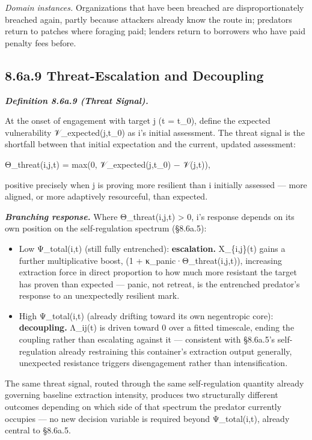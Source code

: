 \documentclass[
]{article}
\begin{document}
\emph{Domain instances.} Organizations that have been breached are
disproportionately breached again, partly because attackers already know
the route in; predators return to patches where foraging paid; lenders
return to borrowers who have paid penalty fees before.

\hypertarget{a.9-threat-escalation-and-decoupling}{%
\subsection{8.6a.9 Threat-Escalation and
Decoupling}\label{a.9-threat-escalation-and-decoupling}}

\emph{\textbf{Definition 8.6a.9 (Threat Signal).}}

At the onset of engagement with target j (t = t\_0), define the expected
vulnerability 𝒱\_expected(j,t\_0) as i's initial assessment. The threat
signal is the shortfall between that initial expectation and the
current, updated assessment:

Θ\_threat(i,j,t) = max(0, 𝒱\_expected(j,t\_0) − 𝒱(j,t)),

positive precisely when j is proving more resilient than i initially
assessed --- more aligned, or more adaptively resourceful, than
expected.

\emph{\textbf{Branching response.}} Where Θ\_threat(i,j,t)
\textgreater{} 0, i's response depends on its own position on the
self-regulation spectrum (§8.6a.5):

\begin{itemize}
\item
  Low Ψ\_total(i,t) (still fully entrenched): \textbf{escalation.}
  X\_\{i,j\}(t) gains a further multiplicative boost, (1 +
  κ\_panic·Θ\_threat(i,j,t)), increasing extraction force in direct
  proportion to how much more resistant the target has proven than
  expected --- panic, not retreat, is the entrenched predator's response
  to an unexpectedly resilient mark.
\item
  High Ψ\_total(i,t) (already drifting toward its own negentropic core):
  \textbf{decoupling.} Λ\_ij(t) is driven toward 0 over a fitted
  timescale, ending the coupling rather than escalating against it ---
  consistent with §8.6a.5's self-regulation already restraining this
  container's extraction output generally, unexpected resistance
  triggers disengagement rather than intensification.
\end{itemize}

The same threat signal, routed through the same self-regulation quantity
already governing baseline extraction intensity, produces two
structurally different outcomes depending on which side of that spectrum
the predator currently occupies --- no new decision variable is required
beyond Ψ\_total(i,t), already central to §8.6a.5.
\end{document}
